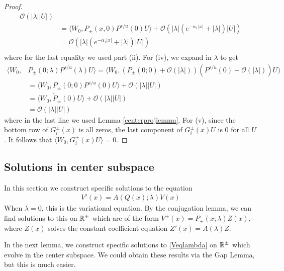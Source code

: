 \documentclass[thesis.tex]{subfiles}
\begin{document}
\begin{lemma}
\begin{proof}
\begin{align*}
\mathcal{O}(|\lambda||U|) \\
&= \langle W_0, P_\pm(x, 0)P^{s/u}(0)U \rangle +
\mathcal{O}(|\lambda|( e^{-\alpha_1 |x|} + |\lambda|)|U|)\\
&= \mathcal{O}(|\lambda|( e^{-\alpha_1 |x|} + |\lambda|)|U|) \\
\end{align*}
where for the last equality we used part (ii). For (iv), we expand in $\lambda$ to get
\begin{align*}
\langle W_0, &P_\pm(0; \lambda)P^{s/u}(\lambda) U \rangle =
\langle W_0, (P_\pm(0; 0) + \mathcal{O}(|\lambda|))(P^{s/u}(0) + \mathcal{O}(|\lambda|)) U) \\
&= \langle W_0, P_\pm(0; 0) P^{s/u}(0)U \rangle + \mathcal{O}(|\lambda||U|) \\
&= \langle W_0, \tilde{P}_\pm(0) U \rangle + \mathcal{O}(|\lambda||U|) \\
&= \mathcal{O}(|\lambda||U|) 
\end{align*}
where in the last line we used Lemma \ref{centerprojlemma}. For (v), since the bottom row of $G_i^\pm(x)$ is all zeros, the last component of $G_i^\pm(x) U$ is 0 for all $U$. It follows that $\langle W_0, G_i^\pm(x) U\rangle = 0$. 
\end{proof}
\end{lemma}

\subsection{Solutions in center subspace}\label{sec:centersol}

In this section we construct specific solutions to the equation
\begin{align}
V'(x) = A(Q(x); \lambda) V(x) \label{Veqlambda}
\end{align}
When $\lambda = 0$, this is the variational equation. By the conjugation lemma, we can find solutions to this on $\mathbb{R}^\pm$ which are of the form $V^\pm(x) = P_\pm(x; \lambda)Z(x)$, where $Z(x)$ solves the constant coefficient equation $Z'(x) = A(\lambda)Z$.

In the next lemma, we construct specific solutions to \eqref{Veqlambda} on $\mathbb{R}^\pm$ which evolve in the center subspace. We could obtain these results via the Gap Lemma, but this is much easier.
\end{document}

